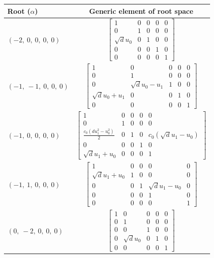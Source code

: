 \documentclass[11pt]{article}
\theoremstyle{definition}
\begin{document}
\noindent \begin{tabular}{|l|c|}
    \hline
    \textbf{Root ($\alpha$)} & \textbf{Generic element of root space} \\
    \hline
    $\left( -2, \  0, \  0, \  0, \  0\right)$ & $\left[\begin{matrix}1 & 0 & 0 & 0 & 0\\0 & 1 & 0 & 0 & 0\\\sqrt{d} u_{0} & 0 & 1 & 0 & 0\\0 & 0 & 0 & 1 & 0\\0 & 0 & 0 & 0 & 1\end{matrix}\right]$ \\
    \hline
    $\left( -1, \  -1, \  0, \  0, \  0\right)$ & $\left[\begin{matrix}1 & 0 & 0 & 0 & 0\\0 & 1 & 0 & 0 & 0\\0 & \sqrt{d} u_{0} - u_{1} & 1 & 0 & 0\\\sqrt{d} u_{0} + u_{1} & 0 & 0 & 1 & 0\\0 & 0 & 0 & 0 & 1\end{matrix}\right]$ \\
    \hline
    $\left( -1, \  0, \  0, \  0, \  0\right)$ & $\left[\begin{matrix}1 & 0 & 0 & 0 & 0\\0 & 1 & 0 & 0 & 0\\\frac{c_{0} \left(d u_{1}^{2} - u_{0}^{2}\right)}{2} & 0 & 1 & 0 & c_{0} \left(\sqrt{d} u_{1} - u_{0}\right)\\0 & 0 & 0 & 1 & 0\\\sqrt{d} u_{1} + u_{0} & 0 & 0 & 0 & 1\end{matrix}\right]$ \\
    \hline
    $\left( -1, \  1, \  0, \  0, \  0\right)$ & $\left[\begin{matrix}1 & 0 & 0 & 0 & 0\\\sqrt{d} u_{1} + u_{0} & 1 & 0 & 0 & 0\\0 & 0 & 1 & \sqrt{d} u_{1} - u_{0} & 0\\0 & 0 & 0 & 1 & 0\\0 & 0 & 0 & 0 & 1\end{matrix}\right]$ \\
    \hline
    $\left( 0, \  -2, \  0, \  0, \  0\right)$ & $\left[\begin{matrix}1 & 0 & 0 & 0 & 0\\0 & 1 & 0 & 0 & 0\\0 & 0 & 1 & 0 & 0\\0 & \sqrt{d} u_{0} & 0 & 1 & 0\\0 & 0 & 0 & 0 & 1\end{matrix}\right]$ \\

\end{tabular}
\end{document}
